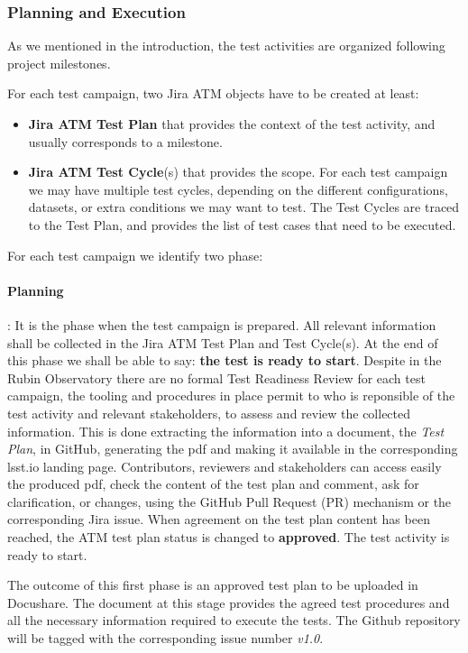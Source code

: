 \subsubsection{Planning and Execution}

As we mentioned in the introduction, the test activities are organized following project milestones.

For each test campaign, two Jira ATM objects have to be created at least:

\begin{itemize}
\item \textbf{Jira ATM Test Plan} that provides the context of the test activity, and usually corresponds to a milestone.
\item \textbf{Jira ATM Test Cycle}(s) that provides the scope. For each test campaign we may have multiple test cycles, 
depending on the different configurations, datasets, or extra conditions we may want to test. The Test Cycles are traced
to the Test Plan, and provides the list of test cases that need to be executed.
\end{itemize}

For each test campaign we identify two phase:

\paragraph{Planning}:
It is the phase when the test campaign is prepared. All relevant information shall be collected in the Jira ATM Test Plan and 
Test Cycle(s). 
At the end of this phase we shall be able to say: \textbf{the test is ready to start}.
Despite in the Rubin Observatory there are no formal Test Readiness Review for each test campaign, 
the tooling and procedures in place permit to who is reponsible of the test activity and relevant stakeholders, to assess and review the collected information. 
This is done extracting the information into a document, the \textit{Test Plan}, in GitHub, generating the pdf and making it available
in the corresponding lsst.io landing page. Contributors, reviewers and stakeholders can access easily the produced pdf,
check the content of the test plan and comment, ask for clarification, or changes, using the GitHub
Pull Request (PR) mechanism or the corresponding Jira issue.
When agreement on the test plan content has been reached, the ATM test plan status is changed to \textbf{approved}. The test activity is ready to start.

The outcome of this first phase is an approved test plan to be uploaded in Docushare. 
The document at this stage provides the agreed test procedures and all the necessary information required to execute the tests.
The Github repository will be tagged with the corresponding issue number \textit{v1.0}.

